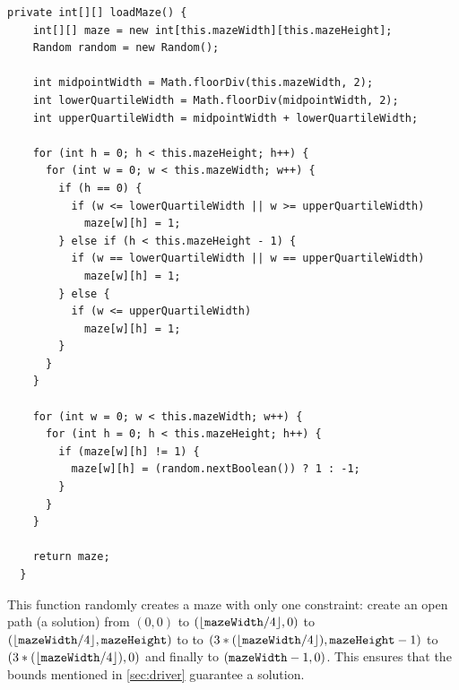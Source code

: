 \documentclass{article}
\begin{document}
\begin{lstlisting}
private int[][] loadMaze() {
    int[][] maze = new int[this.mazeWidth][this.mazeHeight];
    Random random = new Random();
    
    int midpointWidth = Math.floorDiv(this.mazeWidth, 2);
    int lowerQuartileWidth = Math.floorDiv(midpointWidth, 2);
    int upperQuartileWidth = midpointWidth + lowerQuartileWidth;
    
    for (int h = 0; h < this.mazeHeight; h++) {
      for (int w = 0; w < this.mazeWidth; w++) {
        if (h == 0) {
          if (w <= lowerQuartileWidth || w >= upperQuartileWidth)
            maze[w][h] = 1;
        } else if (h < this.mazeHeight - 1) {
          if (w == lowerQuartileWidth || w == upperQuartileWidth)
            maze[w][h] = 1;
        } else {
          if (w <= upperQuartileWidth)
            maze[w][h] = 1;
        }
      }
    }
    
    for (int w = 0; w < this.mazeWidth; w++) {
      for (int h = 0; h < this.mazeHeight; h++) {
        if (maze[w][h] != 1) {
          maze[w][h] = (random.nextBoolean()) ? 1 : -1;
        }
      }
    }
    
    return maze;
  }
\end{lstlisting}
This function randomly creates a maze with only one constraint: create an open path (a solution) from $(0,0)$ to  $(\lfloor \verb`mazeWidth` / 4 \rfloor , 0)$ to $(\lfloor \verb`mazeWidth` / 4 \rfloor , \verb`mazeHeight`)$ to to $(3 * (\lfloor \verb`mazeWidth` / 4 \rfloor) , \verb`mazeHeight` - 1)$ to $(3 * (\lfloor \verb`mazeWidth` / 4 \rfloor) , 0)$ and finally to $(\verb`mazeWidth` - 1 , 0)$. This ensures that the bounds mentioned in \cref{sec:driver} guarantee a solution.
\end{document}
